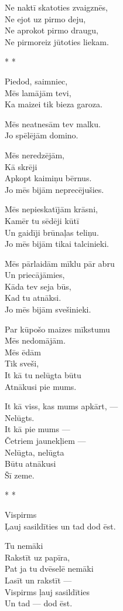 \documentclass[14pt]{extarticle}
\begin{document}
Ne naktī skatoties zvaigznēs,\\
Ne ejot uz pirmo deju,\\
Ne aprokot pirmo draugu,\\
Ne pirmoreiz jūtoties liekam.


\newpage

{\large \sc * * *}

Piedod, saimniec,\\
Mēs lamājām tevi,\\
Ka maizei tik bieza garoza.

Mēs neatnesām tev malku.\\
Jo spēlējām domino.

Mēs neredzējām,\\
Kā skrēji\\
Apkopt kaimiņu bērnus.\\
Jo mēs bijām neprecējušies.

Mēs nepieskatījām krāsni,\\
Kamēr tu sēdēji kūtī\\
Un gaidīji brūnaļas teliņu.\\
Jo mēs bijām tikai talcinieki.

Mēs pārlaidām mīklu pār abru\\
Un priecājāmies,\\
Kāda tev seja būs,\\
Kad tu atnāksi.\\
Jo mēs bijām svešinieki.

Par kūpošo maizes mīkstumu\\
Mēs nedomājām.\\
Mēs ēdām\\
Tik sveši,\\
It kā tu nelūgta būtu\\
Atnākusi pie mums.

It kā viss, kas mums apkārt, ---\\
Nelūgts.\\
It kā pie mums ---\\
Četriem jaunekļiem ---\\
Nelūgta, nelūgta\\
Būtu atnākusi\\
Šī zeme.



\newpage

{\large \sc * * *}

Vispirms\\
Ļauj sasildīties un tad dod ēst.

Tu nemāki\\
Rakstīt uz papīra,\\
Pat ja tu dvēselē nemāki\\
Lasīt un rakstīt ---\\
Vispirms ļauj sasildīties\\
Un tad --- dod ēst.
\end{document}
